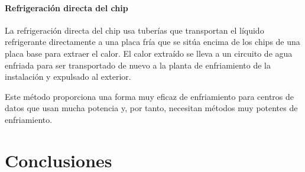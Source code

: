 \subsubsection{Refrigeración directa del chip}

La refrigeración directa del chip usa tuberías que transportan el líquido refrigerante directamente a una placa fría que se sitúa encima de los chips de una placa base para extraer el calor. El calor extraído se lleva a un circuito de agua enfriada para ser transportado de nuevo a la planta de enfriamiento de la instalación  y expulsado al exterior.

Este método proporciona una forma muy eficaz de enfriamiento para centros de datos que usan mucha potencia y, por tanto, necesitan métodos muy potentes de enfriamiento.

\chapter{Conclusiones}

